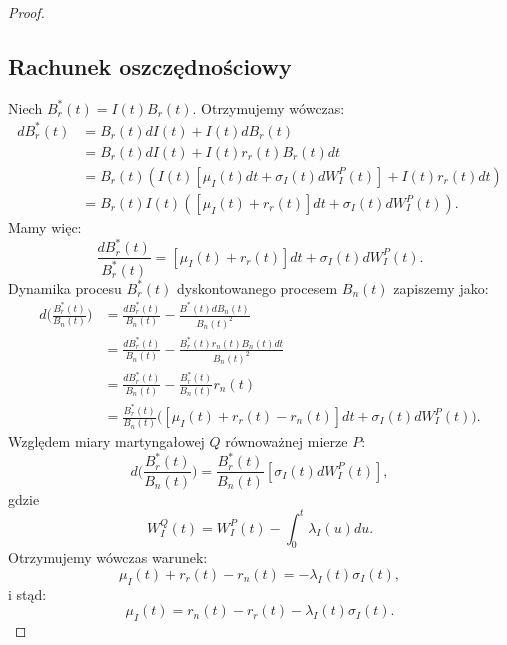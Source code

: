 \documentclass{mini}
\theoremstyle{mythstyle}
\begin{document}
\begin{proof}
	\subsection*{Rachunek oszczędnościowy}
	Niech $B_r^*(t) = I(t) B_r(t)$. Otrzymujemy wówczas:
	\begin{align*}
	d B_r^*(t) &= B_r(t) dI(t) + I(t)dB_r(t) \\
	&= B_r(t) dI(t) + I(t)r_r(t) B_r(t) dt \\
	&= B_r(t) (I(t) [\mu_I(t)dt + \sigma_I(t)dW_I^P(t) ] + I(t)r_r(t)dt) \\
	&= B_r(t) I(t) ([\mu_I(t) + r_r(t) ]dt + \sigma_I(t) dW_I^P(t)).
	\end{align*}
	Mamy więc:
	\begin{equation}
	\frac{dB_r^*(t)}{B_r^*(t)} = [\mu_I(t) + r_r(t) ]dt + \sigma_I(t) dW_I^P(t).
	\end{equation}
	Dynamika procesu $B_r^*(t)$ dyskontowanego procesem $B_n(t)$ zapiszemy jako:
	\begin{align*}
	d\bigg(\frac{B_r^*(t)}{B_n(t)}\bigg) &= \frac{d B_r^*(t)}{B_n(t)} - \frac{B^*(t) d B_n(t)}{B_n(t)^2}\\
	&= \frac{d B_r^*(t)}{B_n(t)} - \frac{B_r^*(t)r_n(t)B_n(t)dt}{B_n(t)^2}\\
	&= \frac{d B_r^*(t)}{B_n(t)} - \frac{B_r^*(t)}{B_n(t)}r_n(t)\\
	&= \frac{B_r^*(t)}{B_n(t)} \bigg( [\mu_I(t) + r_r(t) - r_n(t)]dt + \sigma_I(t) dW_I^P(t)\bigg).
	\end{align*}
	Względem miary martyngałowej $Q$ równoważnej mierze $P$:
	\begin{equation*}
	d\bigg(\frac{B_r^*(t)}{B_n(t)} \bigg) = \frac{B_r^*(t)}{B_n(t)} [\sigma_I(t) dW_I^P(t)],
	\end{equation*}
	gdzie
	\begin{equation*}
	W_I^Q(t) = W_I^P(t) - \int_{0}^{t} \lambda_I(u) du.
	\end{equation*}
	Otrzymujemy wówczas warunek:
	\begin{equation}
	\mu_I(t) + r_r(t) - r_n(t) = -\lambda_I(t) \sigma_I(t),
	\end{equation}
	i stąd:
	\begin{equation}
	\mu_I(t) =  r_n(t) - r_r(t) - \lambda_I(t) \sigma_I(t).
	\end{equation}
	

\end{proof}
\end{document}
